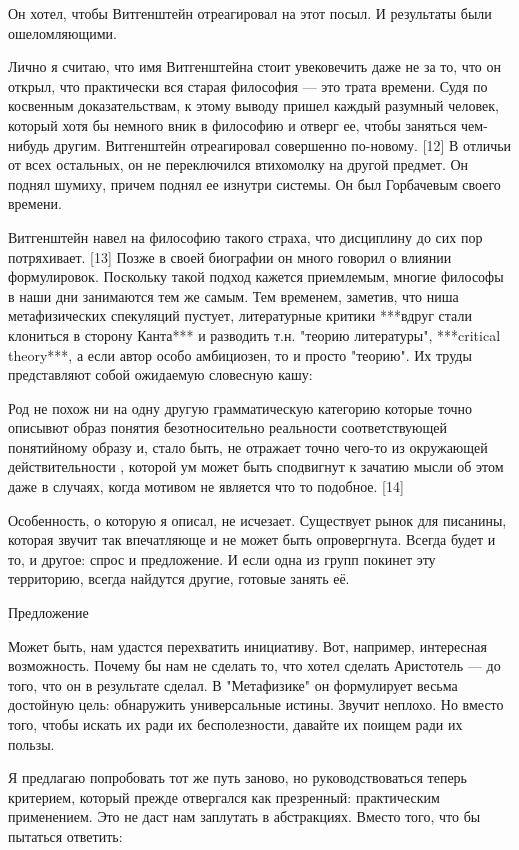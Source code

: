 \documentclass[ebook,12pt,oneside,openany]{memoir}
\begin{document}
Он хотел, чтобы Витгенштейн отреагировал на этот посыл. И результаты
были ошеломляющими.

Лично я считаю, что имя Витгенштейна стоит увековечить даже не за то,
что он открыл, что практически вся старая философия — это трата
времени. Судя по косвенным доказательствам, к этому выводу пришел
каждый разумный человек, который хотя бы немного вник в философию и
отверг ее, чтобы заняться чем-нибудь другим. Витгенштейн отреагировал
совершенно по-новому. [12] В отличьи от всех остальных, он не
переключился втихомолку на другой предмет. Он поднял шумиху, причем
поднял ее изнутри системы. Он был Горбачевым своего времени.

Витгенштейн навел на философию такого страха, что дисциплину до сих
пор потряхивает. [13] Позже в своей биографии он много говорил о
влиянии формулировок. Поскольку такой подход кажется приемлемым,
многие философы в наши дни занимаются тем же самым. Тем временем,
заметив, что ниша метафизических спекуляций пустует, литературные
критики ***вдруг стали клониться в сторону Канта*** и разводить т.н.
"теорию литературы", ***critical theory***, а если автор особо
амбициозен, то и просто "теорию". Их труды представляют собой
ожидаемую словесную кашу:

Род не похож ни на одну другую грамматическую категорию которые точно
описывют образ понятия безотносительно реальности соответствующей
понятийному образу и, стало быть, не отражает точно чего-то из
окружающей действительности , которой ум может быть сподвигнут к
зачатию мысли об этом даже в случаях, когда мотивом не является что то
подобное. [14]

Особенность, о которую я описал, не исчезает. Существует рынок для
писанины, которая звучит так впечатляюще и не может быть опровергнута.
Всегда будет и то, и другое: спрос и предложение. И если одна из групп
покинет эту территорию, всегда найдутся другие, готовые занять её.

Предложение

Может быть, нам удастся перехватить инициативу. Вот, например,
интересная возможность. Почему бы нам не сделать то, что хотел сделать
Аристотель — до того, что он в результате сделал. В "Метафизике" он
формулирует весьма достойную цель: обнаружить универсальные истины.
Звучит неплохо. Но вместо того, чтобы искать их ради их бесполезности,
давайте их поищем ради их пользы.

Я предлагаю попробовать тот же путь заново, но руководствоваться
теперь критерием, который прежде отвергался как презренный:
практическим применением. Это не даст нам заплутать в абстракциях.
Вместо того, что бы пытаться ответить:
\end{document}
